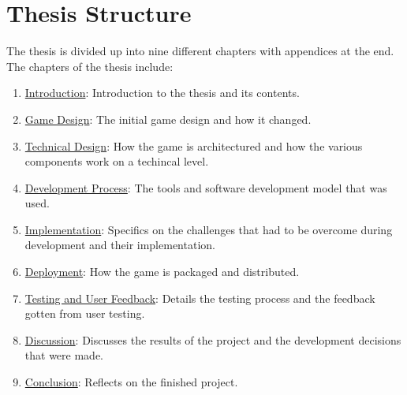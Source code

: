 \section{Thesis Structure}
The thesis is divided up into nine different chapters with appendices at the end. The chapters of the thesis include:
\begin{enumerate}
    \item \hyperref[chap:introduction]{Introduction}: Introduction to the thesis and its contents.
    \item \hyperref[chap:gamedesign]{Game Design}: The initial game design and how it changed. 
    \item \hyperref[chap:technical]{Technical Design}: How the game is architectured and how the various components work on a techincal level.
    \item \hyperref[chap:process]{Development Process}: The tools and software development model that was used. 
    \item \hyperref[chap:implementation]{Implementation}: Specifics on the challenges that had to be overcome during development and their implementation.
    \item \hyperref[chap:deployment]{Deployment}: How the game is packaged and distributed.
    \item \hyperref[chap:testing]{Testing and User Feedback}: Details the testing process and the feedback gotten from user testing.  
    \item \hyperref[chap:discussion]{Discussion}: Discusses the results of the project and the development decisions that were made.
    \item \hyperref[chap:conclusion]{Conclusion}: Reflects on the finished project. 
\end{enumerate}
    